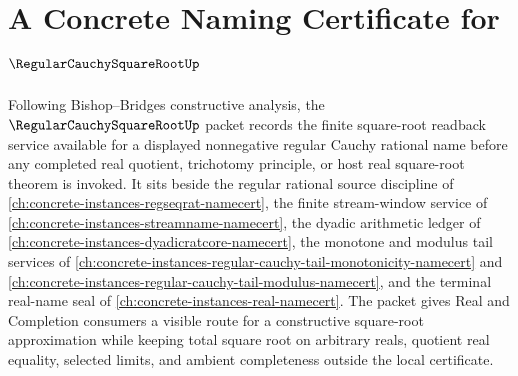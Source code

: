 \chapter{A Concrete Naming Certificate for $\RegularCauchySquareRootUp$}
\label{ch:concrete-instances-regular-cauchy-square-root-namecert}

Following Bishop--Bridges constructive analysis, the $\RegularCauchySquareRootUp$ packet records the finite square-root readback service available for a displayed nonnegative regular Cauchy rational name before any completed real quotient, trichotomy principle, or host real square-root theorem is invoked. It sits beside the regular rational source discipline of \autoref{ch:concrete-instances-regseqrat-namecert}, the finite stream-window service of \autoref{ch:concrete-instances-streamname-namecert}, the dyadic arithmetic ledger of \autoref{ch:concrete-instances-dyadicratcore-namecert}, the monotone and modulus tail services of \autoref{ch:concrete-instances-regular-cauchy-tail-monotonicity-namecert} and \autoref{ch:concrete-instances-regular-cauchy-tail-modulus-namecert}, and the terminal real-name seal of \autoref{ch:concrete-instances-real-namecert}. The packet gives Real and Completion consumers a visible route for a constructive square-root approximation while keeping total square root on arbitrary reals, quotient real equality, selected limits, and ambient completeness outside the local certificate.

